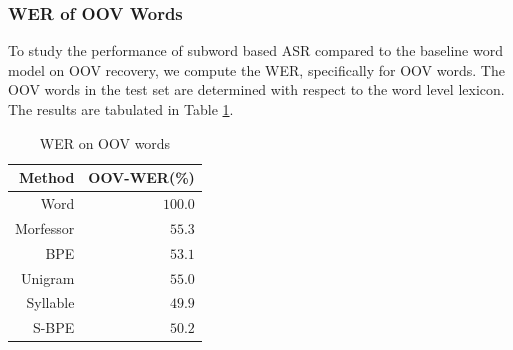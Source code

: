 



\subsubsection{WER of OOV Words}
To study the performance of subword based ASR compared to the baseline word
model on OOV recovery, we compute the WER, specifically for OOV words. The OOV
words in the test set are determined with respect to the word level lexicon.
The results are tabulated in Table \ref{tab:oov-wer}.

\begin{table}[ht]
    \centering
    \caption{WER on OOV words}
    \label{tab:oov-wer}
    \begin{tabular}{rr}
        \hline \hline
        \textbf{Method} & \textbf{OOV-WER(\%)} \\ \hline
        Word            & $100.0$              \\
        Morfessor       & $55.3$               \\
        BPE             & $53.1$               \\
        Unigram         & $55.0$               \\
        Syllable        & $49.9$               \\
        S-BPE           & $50.2$               \\ \hline

        \hline

    \end{tabular}

\end{table}

